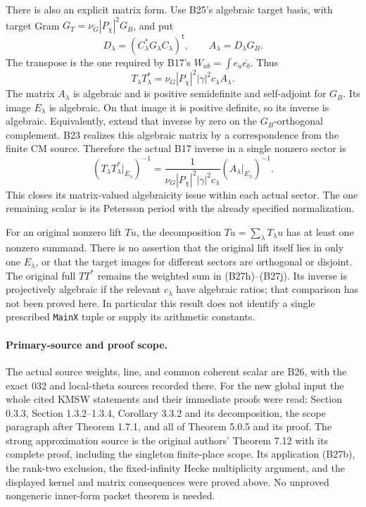 There is also an explicit matrix form.  Use B25's algebraic
target basis, with target Gram
$G_T=\nu_G|P_\chi|^2G_B$, and put
\[
 D_\lambda=(C_\lambda^*G_\lambda C_\lambda)^{\mathsf t},
       \qquad A_\lambda=D_\lambda G_B.
 \tag{B27i}
\]
The transpose is the one required by B17's
$W_{ab}=\int e_a\overline{e_b}$.  Thus
\[
 T_\lambda T_\lambda^*
   =\nu_G|P_\chi|^2|\gamma|^2c_\lambda A_\lambda.
 \tag{B27j}
\]
The matrix $A_\lambda$ is algebraic and is positive
semidefinite and self-adjoint for $G_B$.  Its image
$E_\lambda$ is algebraic.  On that image it is positive
definite, so its inverse is algebraic.  Equivalently,
extend that inverse by zero on the $G_B$-orthogonal
complement.  B23 realizes this algebraic matrix by a
correspondence from the finite CM source.  Therefore the
actual B17 inverse in a single nonzero sector is
\[
 (T_\lambda T_\lambda^*|_{E_\lambda})^{-1}
   =\frac{1}{\nu_G|P_\chi|^2|\gamma|^2c_\lambda}
                          (A_\lambda|_{E_\lambda})^{-1}.
 \tag{B27k}
\]
This closes its matrix-valued algebraicity issue within
each actual sector.  The one remaining scalar is its
Petersson period with the already specified normalization.

For an original nonzero lift $Tu$, the decomposition
$Tu=\sum_\lambda T_\lambda u$ has at least one nonzero
summand.  There is no assertion that the original lift
itself lies in only one $E_\lambda$, or that the target
images for different sectors are orthogonal or disjoint.
The original full $TT^*$ remains the weighted sum in
(B27h)--(B27j).  Its inverse is projectively algebraic
if the relevant $c_\lambda$ have algebraic ratios;
that comparison has not been proved here.  In particular
this result does not identify a single prescribed
\texttt{MainX} tuple or supply its arithmetic constants.

\paragraph{Primary-source and proof scope.}
The actual source weights, line, and common coherent
scalar are B26, with the exact 032 and local-theta
sources recorded there.  For the new global input the
whole cited KMSW statements and their immediate proofs
were read: Section 0.3.3, Section 1.3.2--1.3.4, Corollary
3.3.2 and its decomposition, the scope paragraph after
Theorem 1.7.1, and all of Theorem 5.0.5 and its proof.
The strong approximation source is the original authors'
Theorem 7.12 with its complete proof, including the
singleton finite-place scope.  Its application (B27b),
the rank-two exclusion, the fixed-infinity Hecke
multiplicity argument, and the displayed kernel and
matrix consequences were proved above.  No unproved
nongeneric inner-form packet theorem is needed.
